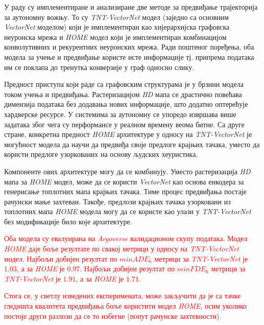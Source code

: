\documentclass[11pt,oneside]{memoir}
\begin{document}
У раду су имплементиране и анализиране две методе за предвиђање трајекторија за аутономну вожњу. 
То су \textit{TNT-VectorNet} модел (заједно са основним \textit{VectorNet} моделом) који је имплементиран као хијерархијска графовска неуронска мрежа
и \textit{HOME} модел који је имплементиран комбинацијом конволутивних и рекурентних неуронских мрежа. Ради поштеног поређења, оба
модела за учење и предвиђање користе исте информације тј. припрема података им се поклапа до тренутка конверзије у граф односно слику.

Предност приступа који раде са графовским структурама је у брзини модела током учења и предвиђања. Растеризацијом \textit{HD} мапа 
се драстично повећава димензија података без додавања нових информације, што додатно оптерећује хардверске ресурсе. У системима за аутономну
се упоредо извршава више задатака због чега су перформансе у реалном времену веома битне. Са друге стране, конкретна предност
\textit{HOME} архитектуре у односу на \textit{TNT-VectorNet} је могућност модела да научи да предвиђа своје предлоге крајњих тачака,
уместо да користи предлоге узоркованих на основу људских хеуристика. 

Компоненте ових архитектуре могу да се комбинују. Уместо растеризација \textit{HD} мапа за \textit{HOME} модел, може да се користи \textit{VectorNet}
као основа енкодера за генерисање топлотних мапа крајњих тачака. Тиме процес предвиђања постаје рачунски мање захтеван. Такође, предлози 
крајњих тачака узорковани из топлотних мапа \textit{HOME} модела могу да се користе као улази у \textit{TNT-VectorNet} без модификације
било које архитектуре.

\textcolor{red}{Оба модела су евалуирана на \textit{Argoverse} валидационом скупу података. Модел \textit{HOME} даје боље резултате по свакој
метрици у односу на \textit{TNT-VectorNet} модел. Најбољи добијен резултат по $minADE_{6}$ метрици за \textit{TNT-VectorNet} је $1.03$, а за \textit{HOME}
је $0.97$. Најбољи добијен резултат по $minFDE_{6}$ метрици за \textit{TNT-VectorNet} је $1.91$, а за \textit{HOME} је $1.71$.} 

\textcolor{red}{Стога се, у светлу изведених експеримената, може закључити да
је са тачке гледишта квалитета предвиђања боље користити модел
\textit{HOME}, осим уколико постоје други разлози да се то избегне (попут
рачунске захтевности).}

\backmatter
\end{document}
